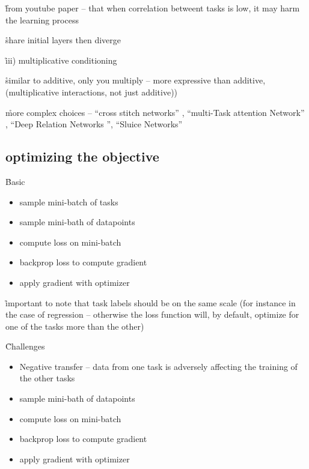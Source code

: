 \r{from youtube paper -- that when correlation betweent tasks is low, it may harm the learning process}

\r{share initial layers then diverge}

\r{iii) multiplicative conditioning}

\r{similar to additive, only you multiply -- more expressive than additive, (multiplicative interactions, not just additive))}

\r{more complex choices -- ``cross stitch networks'' , ``multi-Task attention Network'' , ``Deep Relation Networks '', ``Sluice Networks'' }

\subsection{optimizing the objective}

\r{Basic}
\begin{itemize}[noitemsep,topsep=0pt]
	\item sample mini-batch of tasks
	\item sample mini-bath of datapoints
	\item compute loss on mini-batch
	\item backprop loss to compute gradient
	\item apply gradient with optimizer
\end{itemize}

\r{important to note that task labels should be on the same scale (for instance in the case of regression -- otherwise the loss function will, by default, optimize for one of the tasks more than the other)}

\r{Challenges}
\begin{itemize}[noitemsep,topsep=0pt]
	\item Negative transfer -- data from one task is adversely affecting the training of the other tasks
	\item sample mini-bath of datapoints
	\item compute loss on mini-batch
	\item backprop loss to compute gradient
	\item apply gradient with optimizer
\end{itemize}

